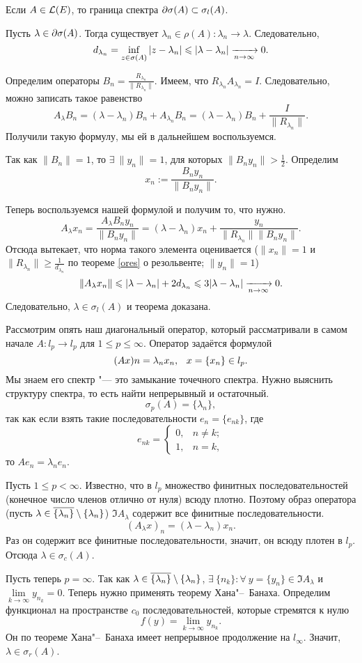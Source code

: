 \begin{The}
  Если $A\in\mathcal L(E)$, то граница спектра $\partial \sigma(A)\subset \sigma_l(A)$.
\end{The}
\begin{Proof}
  Пусть $\lambda\in\partial \sigma(A)$. Тогда существует $\lambda_n\in\rho(A)\colon \lambda_n\to \lambda$. Следовательно, 
\[
  d_{\lambda_n} = \inf\limits_{z\in\sigma(A)} |z-\lambda_n| \leqslant |\lambda-\lambda_n|\xrightarrow[n\rightarrow\infty]{}0.
\]

Определим операторы $B_n = \frac{R_{\lambda_n}}{\|R_{\lambda_n}\|}$. Имеем, что $R_{\lambda_n} A_{\lambda_n} = I$. Следовательно, можно записать такое равенство
\[
  A_\lambda B_n = (\lambda-\lambda_n) B_n + A_{\lambda_n} B_n = 
  (\lambda-\lambda_n)B_n + \frac I{\|R_{\lambda_n}\|}.
\]
Получили такую формулу, мы ей в дальнейшем воспользуемся.

Так как $\|B_n\|=1$, то $\exists\ \|y_n\|=1$, для которых $\|B_ny_n\| > \frac12$. Определим
\[
  x_n := \frac{B_ny_n}{\|B_ny_n\|}.
\]

Теперь воспользуемся нашей формулой и получим то, что нужно.
\[
  A_{\lambda}x_n = \frac{A_{\lambda}B_ny_n}{\|B_ny_n\|} = 
  (\lambda-\lambda_n) x_n + \frac{y_n}{\|R_{\lambda_n}\|\|B_ny_n\|}.
\]
Отсюда вытекает, что норма такого элемента оценивается ($\|x_n\|=1$ и $\|R_{\lambda_n}\|\ge\frac1{d_{\lambda_n}}$ по теореме \ref{ores} о резольвенте; $\|y_n\|=1$)
\[
  \|A_\lambda x_n\|\leqslant |\lambda-\lambda_n| + 2 d_{\lambda_n} \leqslant 3|\lambda-\lambda_n|\xrightarrow[n\rightarrow\infty]{}0.
\]
Следовательно, $\lambda\in\sigma_l(A)$ и теорема доказана.
\end{Proof}

Рассмотрим опять наш диагональный оператор, который рассматривали в самом начале $A\colon l_p\to l_p$ для $1\le p\le \infty$. Оператор задаётся формулой
\[
  (Ax)n = \lambda_n x_n,\pau x= \{x_n\}\in l_p.
\]
Мы знаем его спектр "--- это замыкание точечного спектра. Нужно выяснить структуру спектра, то есть найти непрерывный и остаточный.
\[
  \sigma_p(A) = \{\lambda_n\},
\]
так как если взять такие последовательности $e_n = \{e_{nk}\}$, где 
\[
e_{nk} = \begin{cases}
  0,&n\ne k;\\
  1,&n=k,
\end{cases}
\]
то $Ae_n = \lambda_ne_n$.

Пусть $1\le p<\infty$. Известно, что в $l_p$ множество финитных последовательностей (конечное число членов отлично от нуля) всюду плотно. Поэтому образ оператора (пусть $\lambda\in\overline{\{\lambda_n\}}\setminus\{\lambda_n\}$) $\Im A_\lambda$ содержит все финитные последовательности.
\[
(  A_\lambda x)_n = (\lambda-\lambda_n) x_n.
\]
Раз он содержит все финитные последовательности, значит, он всюду плотен в $l_p$. Отсюда $\lambda\in \sigma_c(A)$.

Пусть теперь $p=\infty$. Так как $\lambda\in\overline{\{\lambda_n\}}\setminus\{\lambda_n\}$, $\exists\ \{n_k\}\colon \forall\ y=\{y_n\}\in \Im A_\lambda$ и $\lim\limits_{k\to\infty} y_{n_k} = 0$.
Теперь нужно применять теорему Хана"--~Банаха. Определим функционал на пространстве $c_0$ последовательностей, которые стремятся к нулю
\[
  f(y) = \lim\limits_{k\to \infty} y_{n_k}.
\]
Он по теореме Хана"--~Банаха имеет непрерывное продолжение на $l_{\infty}$. Значит, $\lambda\in\sigma_r(A)$.
